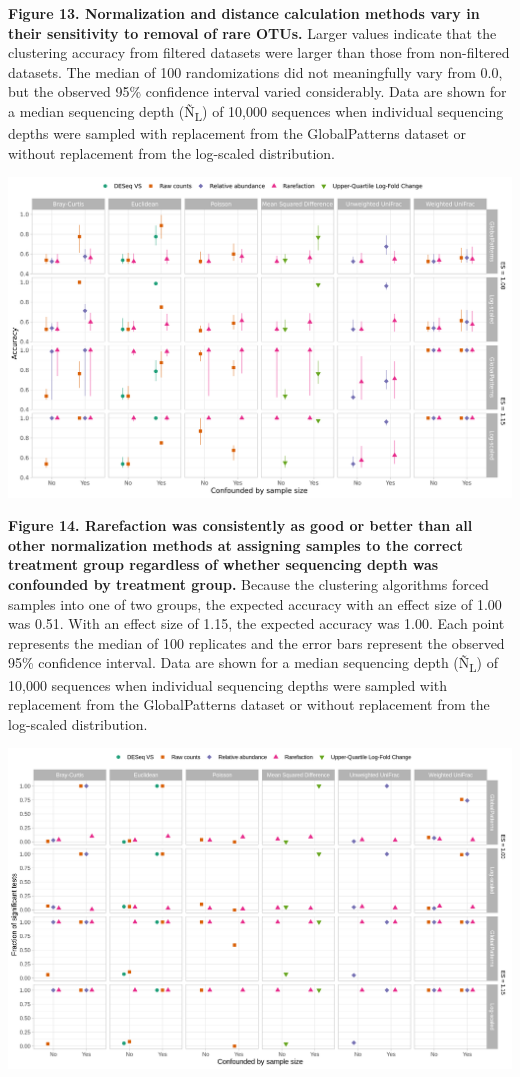 \documentclass[
]{article}
\begin{document}
\textbf{Figure 13. Normalization and distance calculation methods vary
in their sensitivity to removal of rare OTUs.} Larger values indicate
that the clustering accuracy from filtered datasets were larger than
those from non-filtered datasets. The median of 100 randomizations did
not meaningfully vary from 0.0, but the observed 95\% confidence
interval varied considerably. Data are shown for a median sequencing
depth (Ñ\textsubscript{L}) of 10,000 sequences when individual
sequencing depths were sampled with replacement from the GlobalPatterns
dataset or without replacement from the log-scaled distribution.

\newpage

\includegraphics{figure_14.png}

\textbf{Figure 14. Rarefaction was consistently as good or better than
all other normalization methods at assigning samples to the correct
treatment group regardless of whether sequencing depth was confounded by
treatment group.} Because the clustering algorithms forced samples into
one of two groups, the expected accuracy with an effect size of 1.00 was
0.51. With an effect size of 1.15, the expected accuracy was 1.00. Each
point represents the median of 100 replicates and the error bars
represent the observed 95\% confidence interval. Data are shown for a
median sequencing depth (Ñ\textsubscript{L}) of 10,000 sequences when
individual sequencing depths were sampled with replacement from the
GlobalPatterns dataset or without replacement from the log-scaled
distribution.

\newpage

\includegraphics{figure_15.png}
\end{document}

